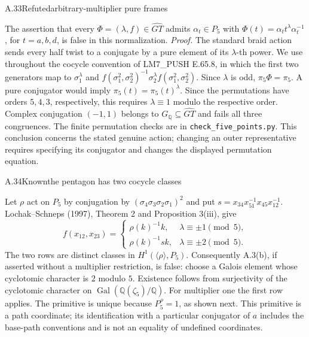 \begin{statement}{A.33}{Refuted}{arbitrary-multiplier pure frames}
\end{statement}
The assertion that every $\Phi=(\lambda,f)\in\widehat{GT}$ admits
$\alpha_t\in P_5$ with $\Phi(t)=\alpha_t t^\lambda\alpha_t^{-1}$, for
$t=a,b,d$, is false in this normalization.
\emph{Proof.} The standard braid action sends every half twist to a conjugate by a
pure element of its $\lambda$-th power. We use throughout the cocycle
convention of LM7\_PUSH E.65.8, in which the first two generators map to
$\sigma_1^\lambda$ and
$f(\sigma_1^2,\sigma_2^2)^{-1}\sigma_2^\lambda
f(\sigma_1^2,\sigma_2^2)$. Since $\lambda$ is odd,
$\pi_5\Phi=\pi_5$. A pure conjugator would imply
$\pi_5(t)=\pi_5(t)^\lambda$. Since the permutations have orders
$5,4,3$, respectively, this requires $\lambda\equiv1$ modulo the
respective order. Complex conjugation $(-1,1)$ belongs to
$G_{\mathbb Q}\subseteq\widehat{GT}$ and fails all three congruences.
The finite permutation checks are in \texttt{check\_five\_points.py}.
This conclusion concerns the stated genuine action; changing an outer
representative requires specifying its conjugator and changes the displayed
permutation equation.

\begin{statement}{A.34}{Known}{the pentagon has two cocycle classes}
\citep[Theorem 2 and Proposition 3(iii)]{LitLochakSchneps1997}
\end{statement}
Let $\rho$ act on $P_5$ by conjugation by
$(\sigma_4\sigma_3\sigma_2\sigma_1)^2$ and put
$s=x_{34}x_{51}^{-1}x_{45}x_{12}^{-1}$. Lochak--Schneps (1997),
Theorem 2 and Proposition 3(iii), give
\[
 f(x_{12},x_{23})=
 \begin{cases}
 \rho(k)^{-1}k,&\lambda\equiv\pm1\pmod5,\\
 \rho(k)^{-1}s k,&\lambda\equiv\pm2\pmod5.
 \end{cases}
\]
The two rows are distinct classes in $H^1(\langle\rho\rangle,P_5)$.
Consequently A.3(b), if asserted without a multiplier restriction, is false:
choose a Galois element whose cyclotomic character is $2$ modulo $5$.
Existence follows from surjectivity of the cyclotomic character on
$\operatorname{Gal}(\mathbb Q(\zeta_5)/\mathbb Q)$.
For multiplier one the first row applies. The primitive is unique because
$P_5^{\rho}=1$, as shown next. This primitive is a path coordinate; its
identification with a particular conjugator of $a$ includes the base-path
conventions and is not an equality of undefined coordinates.

